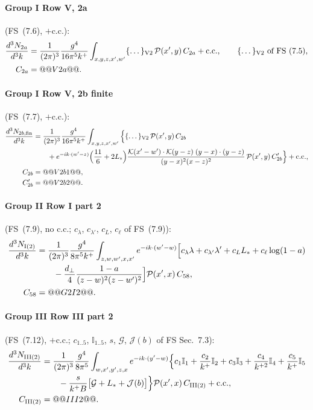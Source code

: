\documentclass[10pt]{article}
\numberwithin{equation}{section}
\newcommand{\Ls}{L_{*}}
\newcommand{\KK}{\mathcal K}
\newcommand{\PP}{\mathcal P}
\newcommand{\pre}{\frac{1}{(2\pi)^3}}
\newcommand{\phw}{e^{-ik\cdot(w'-w)}}
\begin{document}
\paragraph{Group I Row V, 2a} (FS~(7.6), $+$c.c.):
\begin{align}
\frac{d^3N_{2a}}{d^3k}&=\pre\frac{g^4}{16\pi^5k^+}\int_{x,y,z,x',w'}\{\dots\}_{\rm V2}\,\PP(x',y)\,C_{2a}+{\rm c.c.},\qquad\{\dots\}_{\rm V2}\ \text{of FS~(7.5)},\label{eq:s2a}\\
C_{2a}&=@@V2a@@.\notag
\end{align}
\paragraph{Group I Row V, 2b finite} (FS~(7.7), $+$c.c.):
\begin{align}
\frac{d^3N_{2b,\rm fin}}{d^3k}&=\pre\frac{g^4}{16\pi^5k^+}\int_{x,y,z,x',w'}\Big\{\{\dots\}_{\rm V2}\,\PP(x',y)\,C_{2b}\notag\\
&\qquad+e^{-ik\cdot(w'-z)}\Big(\frac{11}{6}+2\Ls\Big)\frac{\KK(x'-w')\cdot\KK(y-z)\;(y-x)\cdot(y-z)}{(y-x)^2(x-z)^2}\,\PP(x',y)\,C_{2b}'\Big\}+{\rm c.c.},\label{eq:s2b}\\
C_{2b}&=@@V2b1@@,\notag\\
C_{2b}'&=@@V2b2@@.\notag
\end{align}
\paragraph{Group II Row I part 2} (FS~(7.9), no c.c.; $c_\lambda$, $c_{\lambda'}$, $c_L$, $c_\ell$ of FS~(7.9)):
\begin{align}
\frac{d^3N_{\rm I(2)}}{d^3k}&=\pre\frac{g^4}{8\pi^5k^+}\int_{z,w,w',x,x'}\phw\Big[c_\lambda\lambda+c_{\lambda'}\lambda'+c_L\Ls+c_\ell\log(1-a)\notag\\
&\qquad-\frac{d_\perp}{4}\frac{1-a}{(z-w)^2(z-w')^2}\Big]\PP(x',x)\,C_{58},\label{eq:s58}\\
C_{58}&=@@G2I2@@.\notag
\end{align}
\paragraph{Group III Row III part 2} (FS~(7.12), $+$c.c.; $c_{1..5}$, $\mathbb I_{1..5}$, $s$, $\mathcal G$, $\mathcal J(b)$ of FS Sec.~7.3):
\begin{align}
\frac{d^3N_{\rm III(2)}}{d^3k}&=\pre\frac{g^4}{8\pi^5}\int_{w,x',y',z,x}e^{-ik\cdot(y'-w)}\Big\{c_1\mathbb I_1+\frac{c_2}{k^+}\mathbb I_2+c_3\mathbb I_3+\frac{c_4}{k^{+2}}\mathbb I_4+\frac{c_5}{k^+}\mathbb I_5\notag\\
&\qquad-\frac{s}{k^+B}\big[\mathcal G+\Ls+\mathcal J(b)\big]\Big\}\PP(x',x)\,C_{\rm III(2)}+{\rm c.c.},\label{eq:sIII2}\\
C_{\rm III(2)}&=@@III2@@.\notag
\end{align}
\end{document}
